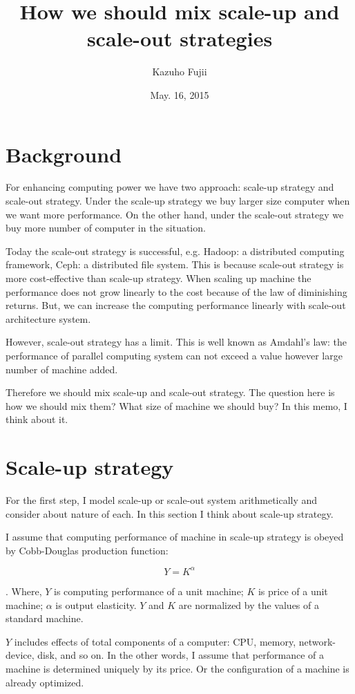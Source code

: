 \documentclass[a4paper,11pt]{article}
\title{How we should mix scale-up and scale-out strategies}
\author{Kazuho Fujii}
\date{May. 16, 2015}
\begin{document}
\maketitle

\section{Background}

For enhancing computing power we have two approach: scale-up strategy and 
scale-out strategy. Under the scale-up strategy we buy larger size computer
when we want more performance. On the other hand, under the scale-out strategy
 we buy more number of computer in the situation.

Today the scale-out strategy is successful, e.g. Hadoop: a distributed
computing framework, Ceph: a distributed file system. This is because 
scale-out strategy is more cost-effective than scale-up strategy. When scaling 
up machine the performance does not grow linearly to the cost because of the law
of diminishing returns. But, we can increase the computing performance linearly
with scale-out architecture system.

However, scale-out strategy has a limit. This is well known as Amdahl's law: the
performance of parallel computing system can not exceed a value however large
number of machine added.

Therefore we should mix scale-up and scale-out strategy. The question here is
how we should mix them? What size of machine we should buy? In this memo, I
think about it.

\section{Scale-up strategy}

For the first step, I model scale-up or scale-out system arithmetically and
consider about nature of each. In this section I think about scale-up strategy.

I assume that computing performance of machine in scale-up strategy is obeyed
by Cobb-Douglas production function:

$$
Y = K^\alpha
$$

. Where, $Y$ is computing performance of a unit machine;
$K$ is price of a unit machine; $\alpha$ is output elasticity.
$Y$ and $K$ are normalized by the values of a standard machine.

$Y$ includes effects of total components of a computer: CPU, memory, network-device, disk, and so on.
In the other words, I assume that performance of a machine is determined uniquely by its price.
Or the configuration of a machine is already optimized. 
\end{document}
